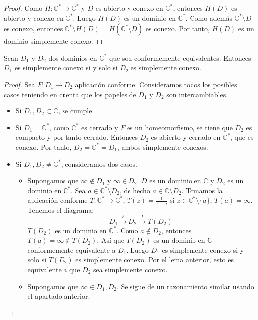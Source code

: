 \begin{proof}
    Como $H: \mathbb{C}^\ast \to \mathbb{C}^\ast$ y $D$ es abierto y conexo en $\mathbb{C}^\ast$, entonces $H(D)$ es abierto y conexo en $\mathbb{C}^\ast$.
    Luego $H(D)$ es un dominio en $\mathbb{C}^\ast$.
    Como además $\mathbb{C}^\ast \setminus D$ es conexo, entonces $\mathbb{C}^\ast \setminus H(D) = H(\mathbb{C}^\ast \setminus D)$ es conexo.
    Por tanto, $H(D)$ es un dominio simplemente conexo.
\end{proof}

\begin{theorem}
    Sean $D_1$ y $D_2$ dos dominios en $\mathbb{C}^\ast$ que son conformemente equivalentes.
    Entonces $D_1$ es simplemente conexo si y solo si $D_2$ es simplemente conexo.
\end{theorem}

\begin{proof}
    Sea $F: D_1 \to D_2$ aplicación conforme.
    Consideramos todos los posibles casos teniendo en cuenta que los papeles de $D_1$ y $D_2$ son intercambiables.
    \begin{itemize}
        \item Si $D_1, D_2 \subset \mathbb{C}$, se cumple.
        \item Si $D_1 = \mathbb{C}^\ast$, como $\mathbb{C}^\ast$ es cerrado y $F$ es un homeomorfismo, se tiene que $D_2$ es compacto y por tanto cerrado.
              Entonces $D_2$ es abierto y cerrado en $\mathbb{C}^\ast$, que es conexo.
              Por tanto, $D_2 = \mathbb{C}^\ast = D_1$, ambos simplemente conexos.
        \item Si $D_1, D_2 \neq \mathbb{C}^\ast$, consideramos dos casos.
              \begin{itemize}
                  \item Supongamos que $\infty \notin D_1$ y $\infty \in D_2$.
                        $D$ es un dominio en $\mathbb{C}$ y $D_2$ es un dominio en $\mathbb{C}^\ast$.
                        Sea $a \in \mathbb{C}^\ast \setminus D_2$, de hecho $a \in \mathbb{C} \setminus D_2$.
                        Tomamos la aplicación conforme $T: \mathbb{C}^\ast \to \mathbb{C}^\ast$, $T(z) = \frac{1}{z-a}$ si $z \in \mathbb{C}^\ast \setminus \{a\}$, $T(a) = \infty$.
                        Tenemos el diagrama:
                        $$D_1 \xrightarrow{F} D_2 \xrightarrow{T} T(D_2)$$
                        $T(D_2)$ es un dominio en $\mathbb{C}^\ast$.
                        Como $a \notin D_2$, entonces $T(a) = \infty \notin T(D_2)$.
                        Así que $T(D_2)$ es un dominio en $\mathbb{C}$ conformemente equivalente a $D_1$.
                        Luego $D_1$ es simplemente conexo si y solo si $T(D_2)$ es simplemente conexo.
                        Por el lema anterior, esto es equivalente a que $D_2$ sea simplemente conexo.

                  \item Supongamos que $\infty \in D_1, D_2$.
                        Se sigue de un razonamiento similar usando el apartado anterior.
              \end{itemize}
    \end{itemize}
\end{proof}


